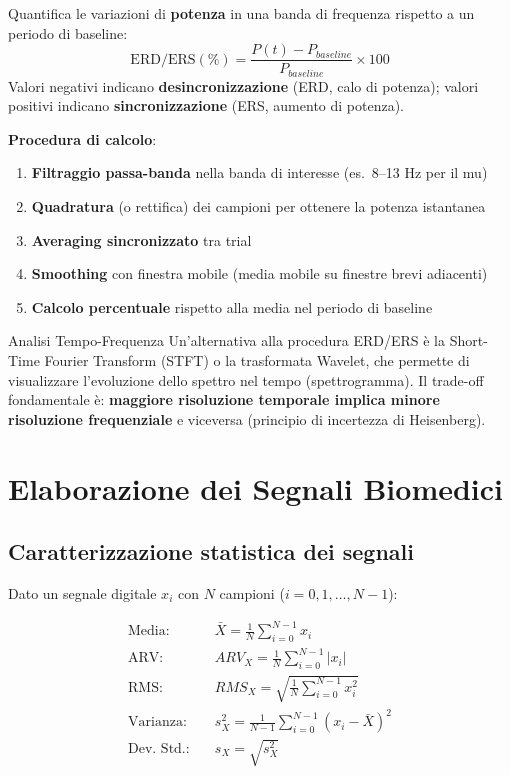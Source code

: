 \begin{definizione}
Quantifica le variazioni di \textbf{potenza} in una banda di frequenza rispetto a un periodo di baseline:
\[
\text{ERD/ERS}(\%) = \frac{P(t) - P_{baseline}}{P_{baseline}} \times 100
\]
Valori negativi indicano \textbf{desincronizzazione} (ERD, calo di potenza); valori positivi indicano \textbf{sincronizzazione} (ERS, aumento di potenza).
\end{definizione}

\textbf{Procedura di calcolo}:
\begin{enumerate}
    \item \textbf{Filtraggio passa-banda} nella banda di interesse (es.\ 8--13 Hz per il mu)
    \item \textbf{Quadratura} (o rettifica) dei campioni per ottenere la potenza istantanea
    \item \textbf{Averaging sincronizzato} tra trial
    \item \textbf{Smoothing} con finestra mobile (media mobile su finestre brevi adiacenti)
    \item \textbf{Calcolo percentuale} rispetto alla media nel periodo di baseline
\end{enumerate}

\begin{approfondimento}{Analisi Tempo-Frequenza}
Un'alternativa alla procedura ERD/ERS è la Short-Time Fourier Transform (STFT) o la trasformata Wavelet, che permette di visualizzare l'evoluzione dello spettro nel tempo (spettrogramma). Il trade-off fondamentale è: \textbf{maggiore risoluzione temporale implica minore risoluzione frequenziale} e viceversa (principio di incertezza di Heisenberg).
\end{approfondimento}

\chapter{Elaborazione dei Segnali Biomedici}

\section{Caratterizzazione statistica dei segnali}

Dato un segnale digitale $x_i$ con $N$ campioni ($i = 0, 1, \ldots, N-1$):

\begin{align}
\text{Media:} \quad & \bar{X} = \frac{1}{N}\sum_{i=0}^{N-1} x_i \\[6pt]
\text{ARV:} \quad & ARV_X = \frac{1}{N}\sum_{i=0}^{N-1} |x_i| \\[6pt]
\text{RMS:} \quad & RMS_X = \sqrt{\frac{1}{N}\sum_{i=0}^{N-1} x_i^2} \\[6pt]
\text{Varianza:} \quad & s_X^2 = \frac{1}{N-1}\sum_{i=0}^{N-1} (x_i - \bar{X})^2 \\[6pt]
\text{Dev.\ Std.:} \quad & s_X = \sqrt{s_X^2}
\end{align}

